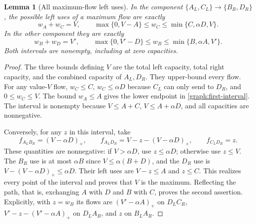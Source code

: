 \documentclass[11pt]{article}
\newtheorem{lemma}[theorem]{Lemma}
\theoremstyle{definition}\newtheorem{definition}[theorem]{Definition}
\theoremstyle{remark}\newtheorem{remark}[theorem]{Remark}
\begin{document}
\begin{lemma}[All maximum-flow left uses]\label{graph:flow-interval}
In the component $\{A_L,C_L\}\to\{B_R,D_R\}$, the possible left uses
of a maximum flow are exactly
\begin{equation}\label{graph:first-interval}
 w_A+w_C=V,\qquad
 \max\{0,V-A\}\le w_C\le\min\{C,\alpha D,V\}.
\end{equation}
In the other component they are exactly
\begin{equation}\label{graph:second-interval}
 w_B+w_D=V',\qquad
 \max\{0,V'-D\}\le w_B\le\min\{B,\alpha A,V'\}.
\end{equation}
Both intervals are nonempty, including at zero capacities.
\end{lemma}
\begin{proof}
The three bounds defining $V$ are the total left capacity, total right
capacity, and the combined capacity of $A_L,D_R$. They upper-bound every
flow. For any value-$V$ flow, $w_C\le C$, $w_C\le\alpha D$ because
$C_L$ can only send to $D_R$, and $0\le w_C\le V$.
The bound $w_A\le A$ gives the lower endpoint in
\eqref{graph:first-interval}. The interval is nonempty because
$V\le A+C$, $V\le A+\alpha D$, and all capacities are nonnegative.

Conversely, for any $z$ in this interval, take
\[
 f_{A_LB_R}=(V-\alpha D)_+,\qquad
 f_{A_LD_R}=V-z-(V-\alpha D)_+,\qquad f_{C_LD_R}=z.
\]
These quantities are nonnegative: if $V>\alpha D$, use $z\le\alpha D$;
otherwise use $z\le V$. The $B_R$ use is at most $\alpha B$ since
$V\le\alpha(B+D)$, and the $D_R$ use is
$V-(V-\alpha D)_+\le\alpha D$. Their left uses are $V-z\le A$ and
$z\le C$. This realizes every point of the interval and proves that $V$
is the maximum. Reflecting the path, that is, exchanging $A$ with $D$ and
$B$ with $C$, proves the second assertion. Explicitly, with $z=w_B$ its
flows are $(V'-\alpha A)_+$ on $D_LC_R$, $V'-z-(V'-\alpha A)_+$ on
$D_LA_R$, and $z$ on $B_LA_R$.
\end{proof}
\end{document}
